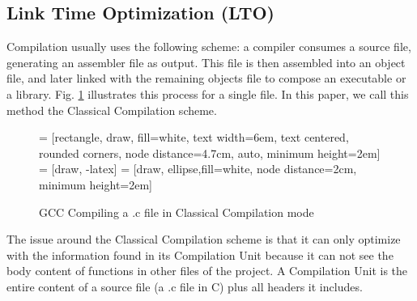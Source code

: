 \documentclass[runningheads]{llncs}
\begin{document}
\subsection{Link Time Optimization (LTO)} \label{lto_section}

Compilation usually uses the following scheme: a compiler consumes a source file,
generating an assembler file as output. This file is then assembled into an object file,
and later linked with the remaining objects file to compose an executable or a library.
Fig. \ref{fig:gnu_toolchain} illustrates this process for a single file. In this paper,
we call this method the Classical Compilation scheme.

\begin{figure}
 = [rectangle, draw, fill=white,
    text width=6em, text centered, rounded corners, node distance=4.7cm, auto, minimum height=2em]
 = [draw, -latex]
 = [draw, ellipse,fill=white, node distance=2cm,
    minimum height=2em]
%
\caption{GCC Compiling a .c file in Classical Compilation mode}
\label{fig:gnu_toolchain}
\end{figure}

The issue around the Classical Compilation scheme is that it can only optimize with
the information found in its Compilation Unit because it can not see the body
content of functions in other files of the project. A Compilation Unit is the
entire content of a source file (a .c file in C) plus all headers it includes.
\end{document}
